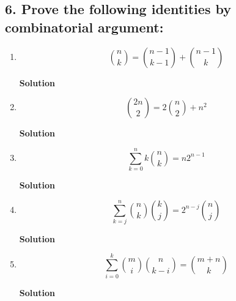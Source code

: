 \documentclass{article}\usepackage{amsmath,amssymb,amsthm,tikz,tkz-graph,color,chngpage,soul,hyperref,csquotes,graphicx,floatrow}\newcommand*{\QEDB}{\hfill\ensuremath{\square}}\newtheorem*{prop}{Proposition}\renewcommand{\theenumi}{\alph{enumi}}\usepackage[shortlabels]{enumitem}\usepackage[nobreak=true]{mdframed}\usetikzlibrary{matrix,calc}\MakeOuterQuote{"}\usepackage[margin=0.75in]{geometry} \newtheorem{theorem}{Theorem}
\begin{document}
\subsection*{6. Prove the following identities by combinatorial argument:}
\begin{enumerate}
\item $${n\choose k}= {{n-1}\choose {k-1}} + {{n-1}\choose k}$$
\begin{mdframed}
\textbf{Solution}

\end{mdframed}
\item $${{2n}\choose 2}=2{n\choose 2}+n^2$$
\begin{mdframed}
\textbf{Solution}

\end{mdframed}
\item $$\sum_{k=0}^nk{n\choose k}=n2^{n-1}$$
\begin{mdframed}
\textbf{Solution}

\end{mdframed}
\item $$\sum_{k=j}^n{n\choose k}{k\choose j}=2^{n-j}{n\choose j}$$
\begin{mdframed}
\textbf{Solution}

\end{mdframed}
\item $$\sum_{i=0}^k{m\choose i}{n\choose{k-i}}={{m+n}\choose k}$$
\begin{mdframed}
\textbf{Solution}

\end{mdframed}
\end{enumerate}
\clearpage
\end{document}
